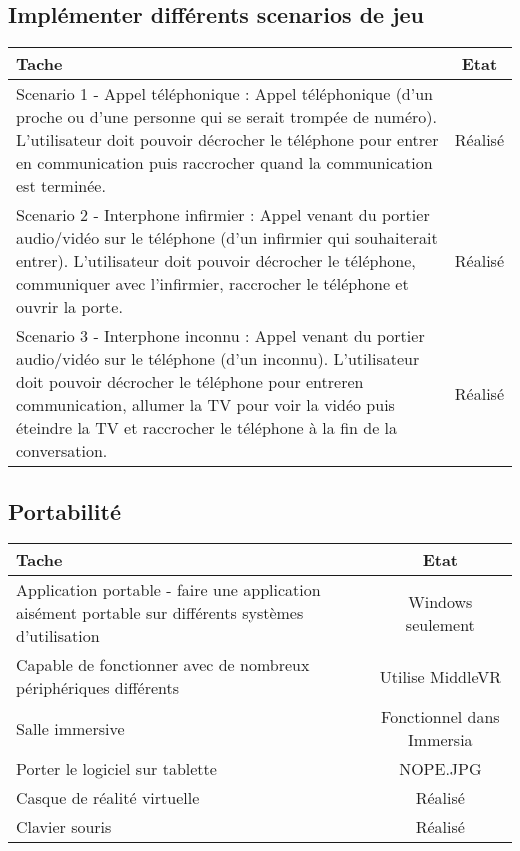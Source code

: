 \subsection{Implémenter différents scenarios de jeu}		
\begin{tabular}{|p{13cm}|c|}
	\hline
	Tache & Etat \\ \hline
	Scenario 1 - Appel téléphonique : Appel téléphonique (d'un proche ou d'une personne qui se serait trompée de numéro). L'utilisateur doit pouvoir décrocher le téléphone pour entrer en communication puis raccrocher quand la communication est terminée. & Réalisé \\ \hline
	Scenario 2 - Interphone infirmier : Appel venant du portier audio/vidéo sur le téléphone (d'un infirmier qui souhaiterait entrer). L'utilisateur doit pouvoir décrocher le téléphone, communiquer avec l'infirmier, raccrocher le téléphone et ouvrir la porte.& Réalisé \\ \hline
	Scenario 3 - Interphone inconnu : Appel venant du portier audio/vidéo sur le téléphone (d'un inconnu). L'utilisateur doit pouvoir décrocher le téléphone pour entreren communication, allumer la TV pour voir la vidéo puis éteindre la TV et raccrocher le téléphone à la fin de la conversation.& Réalisé \\ \hline
\end{tabular}
		

\subsection{Portabilité}
\begin{tabular}{|p{13cm}|c|}
	\hline
	Tache & Etat \\ \hline
	Application portable - faire une application aisément portable sur différents systèmes d'utilisation & Windows seulement \\ \hline
	Capable de fonctionner avec de nombreux périphériques différents & Utilise MiddleVR \\ \hline
	Salle immersive & Fonctionnel dans Immersia \\ \hline
	Porter le logiciel sur tablette  & NOPE.JPG \\ \hline
	Casque de réalité virtuelle & Réalisé \\ \hline
	Clavier souris & Réalisé \\ \hline
\end{tabular}
